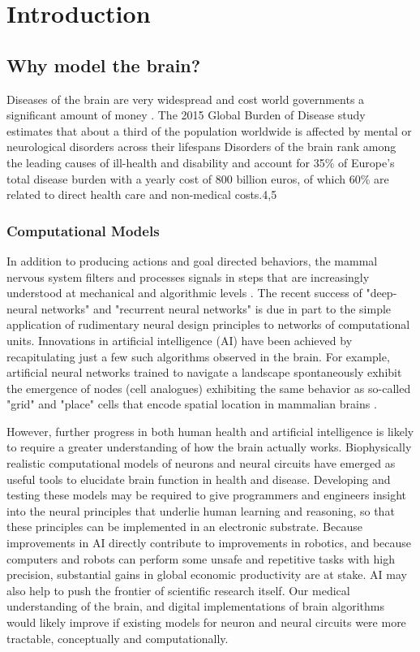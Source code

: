 \chapter{Introduction}
\section{Why model the brain?}
Diseases of the brain are very widespread and cost world governments a significant amount of money \cite{who}.
The 2015 Global Burden of Disease study estimates that about a third of the population worldwide is affected by mental or neurological disorders across their lifespans
Disorders of the brain rank among the leading causes of ill-health and disability and account for 35\% of Europe’s total disease burden with a yearly cost of 800 billion euros, of which 60\% are related to direct health care and non-medical costs.4,5 %
\subsection{Computational Models}
In addition to producing actions and goal directed behaviors, the mammal nervous system filters and processes signals in steps that are increasingly understood at mechanical and algorithmic levels \cite{marr1976understanding}.
The recent success of "deep-neural networks" and "recurrent neural networks" is due in part to the simple application of rudimentary neural design principles to networks of computational units.
Innovations in artificial intelligence (AI) have been achieved by recapitulating just a few such algorithms observed in the brain.
For example, artificial neural networks trained to navigate a landscape spontaneously exhibit the emergence of nodes (cell analogues) exhibiting the same behavior as so-called "grid" and "place" cells that encode spatial location in mammalian brains \cite{banino2018vector}.

However, further progress in both human health and artificial intelligence is likely to require a greater understanding of how the brain actually works.
Biophysically realistic computational models of neurons and neural circuits have emerged as useful tools to elucidate brain function in health and disease.
Developing and testing these models may be required to give programmers and engineers insight into the neural principles that underlie human learning and reasoning, so that these principles can be implemented in an electronic substrate.
Because improvements in AI directly contribute to improvements in robotics, and because computers and robots can perform some unsafe and repetitive tasks with high precision, substantial gains in global economic productivity are at stake.
AI may also help to push the frontier of scientific research itself.
Our medical understanding of the brain, and digital implementations of brain algorithms would likely improve if existing models for neuron and neural circuits were more tractable, conceptually and computationally.

